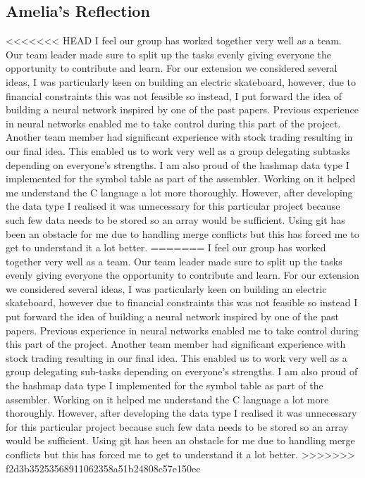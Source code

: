 \documentclass[11pt]{article}
\begin{document}
\subsection{Amelia's Reflection}
<<<<<<< HEAD
I feel our group has worked together very well as a team. Our team leader made sure to split up the tasks evenly giving everyone the opportunity to contribute and learn. For our extension we considered several ideas, I was particularly keen on building an electric skateboard, however, due to financial constraints this was not feasible so instead, I put forward the idea of building a neural network inspired by one of the past papers. Previous experience in neural networks enabled me to take control during this part of the project. Another team member had significant experience with stock trading resulting in our final idea. This enabled us to work very well as a group delegating subtasks depending on everyone's strengths. I am also proud of the hashmap data type I implemented for the symbol table as part of the assembler. Working on it helped me understand the C language a lot more thoroughly. However, after developing the data type I realised it was unnecessary for this particular project because such few data needs to be stored so an array would be sufficient. Using git has been an obstacle for me due to handling merge conflicts but this has forced me to get to understand it a lot better.
=======
I feel our group has worked together very well as a team. Our team leader made sure to split up the tasks evenly giving everyone the opportunity to contribute and learn. For our extension we considered several ideas, I was particularly keen on building an electric skateboard, however due to financial constraints this was not feasible so instead I put forward the idea of building a neural network inspired by one of the past papers. Previous experience in neural networks enabled me to take control during this part of the project. Another team member had significant experience with stock trading resulting in our final idea. This enabled us to work very well as a group delegating sub-tasks depending on everyone's strengths. I am also proud of the hashmap data type I implemented for the symbol table as part of the assembler. Working on it helped me understand the C language a lot more thoroughly. However, after developing the data type I realised it was unnecessary for this particular project because such few data needs to be stored so an array would be sufficient. Using git has been an obstacle for me due to handling merge conflicts but this has forced me to get to understand it a lot better.
>>>>>>> f2d3b35253568911062358a51b24808c57e150ec
\end{document}
